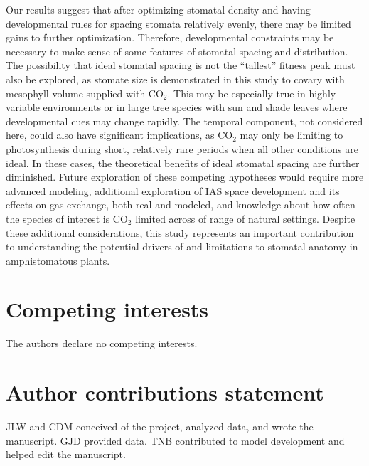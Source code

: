 \documentclass[webpdf,large,modern,unnumsec,namedate]{oup-authoring-template}
\begin{document}
Our results suggest that after optimizing stomatal density and having
developmental rules for spacing stomata relatively evenly, there may be
limited gains to further optimization. Therefore, developmental
constraints may be necessary to make sense of some features of stomatal
spacing and distribution. The possibility that ideal stomatal spacing is
not the ``tallest'' fitness peak must also be explored, as stomate size
is demonstrated in this study to covary with mesophyll volume supplied
with CO\(_2\). This may be especially true in highly variable
environments or in large tree species with sun and shade leaves where
developmental cues may change rapidly. The temporal component, not
considered here, could also have significant implications, as CO\(_2\)
may only be limiting to photosynthesis during short, relatively rare
periods when all other conditions are ideal. In these cases, the
theoretical benefits of ideal stomatal spacing are further diminished.
Future exploration of these competing hypotheses would require more
advanced modeling, additional exploration of IAS space development and
its effects on gas exchange, both real and modeled, and knowledge about
how often the species of interest is CO\(_2\) limited across of range of
natural settings. Despite these additional considerations, this study
represents an important contribution to understanding the potential
drivers of and limitations to stomatal anatomy in amphistomatous plants.

\section{Competing interests}

The authors declare no competing interests.

\section{Author contributions statement}

JLW and CDM conceived of the project, analyzed data, and wrote the
manuscript. GJD provided data. TNB contributed to model development and
helped edit the manuscript.


\renewcommand\refname{References}




\end{document}
